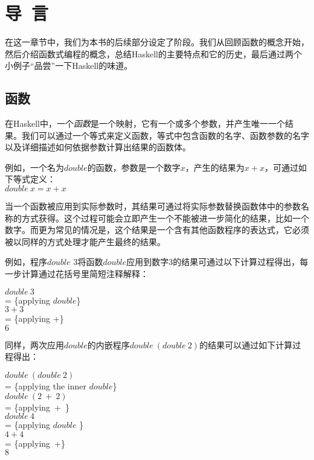 \chapter{导~言}
在这一章节中，我们为本书的后续部分设定了阶段。我们从回顾函数的概念开始，然后介绍函数式编程的概念，总结Haskell的主要特点和它的历史，最后通过两个小例子“品尝”一下Haskell的味道。

\section{函数}
在Haskell中，一个\textit{函数}是一个映射，它有一个或多个参数，并产生唯一一个结果。我们可以通过一个等式来定义函数，等式中包含函数的名字、函数参数的名字以及详细描述如何依据参数计算出结果的函数体。

例如，一个名为$double$的函数，参数是一个数字$x$，产生的结果为$x + x$，可通过如下等式定义：\\
\hspace*{1cm} $double~x = x + x$

当一个函数被应用到实际参数时，其结果可通过将实际参数替换函数体中的参数名称的方式获得。这个过程可能会立即产生一个不能被进一步简化的结果，比如一个数字。而更为常见的情况是，这个结果是一个含有其他函数程序的表达式，它必须被以同样的方式处理才能产生最终的结果。

例如，程序$double$ 3将函数$double$应用到数字3的结果可通过以下计算过程得出，每一步计算通过花括号里简短注释解释：

\noindent\hspace*{1cm} $double~3$ \\ 
\hspace*{1cm} = \{applying $double$\} \\
\hspace*{1cm} $3 + 3$\\
\hspace*{1cm} = \{applying +\}\\
\hspace*{1cm} $6$

同样，两次应用$double$的内嵌程序$double~(double~2)$的结果可以通过如下计算过程得出：

\noindent\hspace*{1cm} $double~(double~2)$\\
\hspace*{1cm} = \{applying the inner $double$\}\\
\hspace*{1cm} $double~(2~+~2)$\\
\hspace*{1cm} = \{applying~+~\}\\
\hspace*{1cm} $double~4$\\
\hspace*{1cm} = \{applying $double$ \}\\
\hspace*{1cm} $4+4$\\
\hspace*{1cm} = \{applying~+\}\\
\hspace*{1cm} $8$

